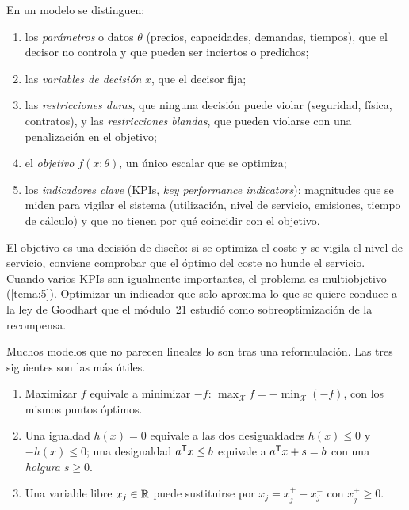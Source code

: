 \begin{definicion}\label{def:elementos}
En un modelo se distinguen:
\begin{enumerate}[label=(\alph*)]
  \item los \emph{parámetros} o datos $\theta$ (precios, capacidades, demandas, tiempos), que el decisor no controla y que pueden ser inciertos o predichos;
  \item las \emph{variables de decisión} $x$, que el decisor fija;
  \item las \emph{restricciones duras}, que ninguna decisión puede violar (seguridad, física, contratos), y las \emph{restricciones blandas}, que pueden violarse con una penalización en el objetivo;
  \item el \emph{objetivo} $f(x;\theta)$, un único escalar que se optimiza;
  \item los \emph{indicadores clave} (KPIs, \emph{key performance indicators}): magnitudes que se miden para vigilar el sistema (utilización, nivel de servicio, emisiones, tiempo de cálculo) y que no tienen por qué coincidir con el objetivo.
\end{enumerate}
\end{definicion}

\begin{observacion}
El objetivo es una decisión de diseño: si se optimiza el coste y se vigila el nivel de servicio, conviene comprobar que el óptimo del coste no hunde el servicio. Cuando varios KPIs son igualmente importantes, el problema es multiobjetivo (\cref{tema:5}). Optimizar un indicador que solo aproxima lo que se quiere conduce a la ley de Goodhart que el módulo~21 estudió como sobreoptimización de la recompensa.
\end{observacion}

Muchos modelos que no parecen lineales lo son tras una reformulación. Las tres siguientes son las más útiles.

\begin{proposicion}\label{prop:reform}
\begin{enumerate}
  \item Maximizar $f$ equivale a minimizar $-f$: $\max_{\mathcal{X}}f=-\min_{\mathcal{X}}(-f)$, con los mismos puntos óptimos.
  \item Una igualdad $h(x)=0$ equivale a las dos desigualdades $h(x)\le 0$ y $-h(x)\le 0$; una desigualdad $a^{\mathsf{T}} x\le b$ equivale a $a^{\mathsf{T}} x+s=b$ con una \emph{holgura} $s\ge 0$.
  \item Una variable libre $x_j\in\mathbb{R}$ puede sustituirse por $x_j=x_j^{+}-x_j^{-}$ con $x_j^{\pm}\ge 0$.
\end{enumerate}
\end{proposicion}

